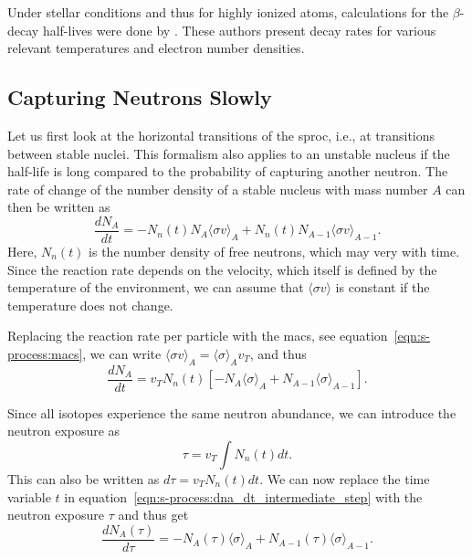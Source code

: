 Under stellar conditions and thus for highly ionized atoms, calculations for the $\beta$-decay half-lives were done by \citet{takahashi87}. These authors present decay rates for various relevant temperatures and electron number densities.


\subsection{Capturing Neutrons Slowly}

Let us first look at the horizontal transitions of the \ac{sproc}, i.e., at transitions between stable nuclei. This formalism also applies to an unstable nucleus if the half-life is long compared to the probability of capturing another neutron. The rate of change of the number density of a stable nucleus with mass number $A$ can then be written as
\begin{equation}
    \frac{dN_A}{dt} = -N_n(t) N_A \langle\sigma v\rangle_A + N_n(t) N_{A-1} \langle\sigma v\rangle_{A-1}.
\end{equation}
Here, $N_n(t)$ is the number density of free neutrons, which may very with time. Since the reaction rate depends on the velocity, which itself is defined by the temperature of the environment, we can assume that $\langle\sigma v\rangle$ is constant if the temperature does not change. 

Replacing the reaction rate per particle with the \ac{macs}, see equation~\eqref{eqn:s-process:macs}, we can write $\langle \sigma v\rangle_{A} = \langle \sigma \rangle_{A} v_T$, and thus
\begin{equation}
    \frac{dN_A}{dt} = v_T N_n(t) \left[-N_A \langle\sigma\rangle_A + N_{A-1} \langle \sigma \rangle_{A-1} \right]. \label{eqn:s-process:dna_dt_intermediate_step}
\end{equation}

Since all isotopes experience the same neutron abundance, we can introduce the neutron exposure as
\begin{equation}
    \tau = v_T \int N_n(t)dt. \label{eqn:s-process:neutron_exposure}
\end{equation}
This can also be written as $d\tau = v_T N_n(t)dt$. We can now replace the time variable $t$ in equation~\eqref{eqn:s-process:dna_dt_intermediate_step} with the neutron exposure $\tau$ and thus get
\begin{equation}
    \frac{dN_A(\tau)}{d\tau} = -N_A(\tau)\langle\sigma\rangle_A + N_{A-1}(\tau)\langle\sigma\rangle_{A-1}. \label{eqn:s-process:dna_dtau}
\end{equation}


